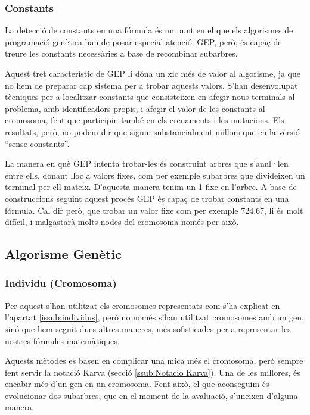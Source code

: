 

\subsubsection{Constants} %
\label{ssub:Constants}
La detecció de constants en una fórmula és un punt en el que els algorismes de
programació genètica han de posar especial atenció.  GEP, però, és capaç de
treure les constants necessàries a base de recombinar subarbres.

Aquest tret característic de GEP li dóna un xic més de valor al algorisme, ja
que no hem de preparar cap sistema per a trobar aquests valors.  S'han
desenvolupat tècniques per a localitzar constants que consisteixen en afegir
nous terminals al problema, amb identificadors propis, i afegir el valor de les
constants al cromosoma, fent que participin també en els creuaments i les
mutacions.  Els resultats, però, no podem dir que siguin substancialment millors
que en la versió ``sense constants''.

La manera en què GEP intenta trobar-les és construint arbres que s'anul·len
entre ells, donant lloc a valors fixes, com per exemple subarbres que divideixen
un terminal per ell mateix.  D'aquesta manera tenim un 1 fixe en l'arbre.  A
base de construccions seguint aquest procés GEP és capaç de trobar constants en
una fórmula.  Cal dir però, que trobar un valor fixe com per exemple 724.67, li
és molt difícil, i malgastarà molts nodes del cromosoma només per això.


\subsection{Algorisme Genètic} %
\label{ssec:GAlgorisme Genetic}

\subsubsection{Individu (Cromosoma)} %
\label{ssub:Individu (Cromosoma}

Per aquest s'han utilitzat els cromosomes representats com s'ha explicat en
l'apartat \ref{issub:individus}, però no només s'han utilitzat cromosomes amb un
gen, sinó que hem seguit dues altres maneres, més sofisticades per a representar
les nostres fórmules matemàtiques.

Aquests mètodes \cite{ferreira:2006} es basen en complicar una mica més el cromosoma,
però sempre fent servir la notació Karva (secció \ref{ssub:Notacio Karva}).  Una de les millores, és
encabir més d'un gen en un cromosoma. Fent això, el que aconseguim és
evolucionar dos subarbres, que en el moment de la avaluació, s'uneixen d'alguna
manera.

